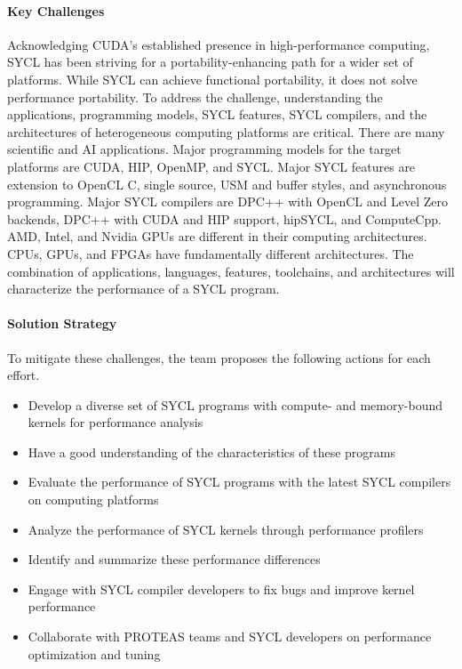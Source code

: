 \paragraph{Key Challenges}
Acknowledging CUDA's established presence in high-performance computing, SYCL has been striving for a portability-enhancing path for a wider set of platforms. While SYCL can achieve functional portability, it does not solve performance portability. To address the challenge, understanding the applications, programming models, SYCL features, SYCL compilers, and the architectures of heterogeneous computing platforms are critical. There are many scientific and AI applications. Major programming models for the target platforms are CUDA, HIP, OpenMP, and SYCL. Major SYCL features are extension to OpenCL C, single source, USM and buffer styles, and asynchronous programming. Major SYCL compilers are DPC++ with OpenCL and Level Zero backends, DPC++ with CUDA and HIP support, hipSYCL, and ComputeCpp. AMD, Intel, and Nvidia GPUs are different in their computing architectures. CPUs, GPUs, and FPGAs have fundamentally different architectures. The combination of applications, languages, features, toolchains, and architectures will characterize the performance of a SYCL program.


\paragraph{Solution Strategy}
To mitigate these challenges, the team proposes the following actions for each effort.
\begin{itemize}
\item Develop a diverse set of SYCL programs with compute- and memory-bound kernels for performance analysis  
\item Have a good understanding of the characteristics of these programs 
\item Evaluate the performance of SYCL programs with the latest SYCL compilers on computing platforms
\item Analyze the performance of SYCL kernels through performance profilers
\item Identify and summarize these performance differences
\item Engage with SYCL compiler developers to fix bugs and improve kernel performance
\item Collaborate with PROTEAS teams and SYCL developers on performance optimization and tuning
\end{itemize}


